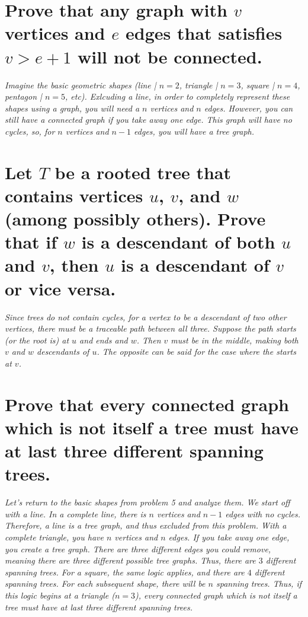 \documentclass{article}
\begin{document}

\section{Prove that any graph with $v$ vertices and $e$ edges that satisfies $v>e+1$ will not be connected.}
\hspace{1cm}\textit{Imagine the basic geometric shapes (line | $n=2$, triangle | $n=3$, square | $n=4$, pentagon | $n=5$, etc). Exlcuding a line, in order to completely represent these shapes using a graph, you will need a $n$ vertices and $n$ edges. However, you can still have a connected graph if you take away one edge. This graph will have no cycles, so, for $n$ vertices and $n-1$ edges, you will have a tree graph.}


\section{Let $T$ be a rooted tree that contains vertices $u$, $v$, and $w$ (among possibly others). Prove that if $w$ is a descendant of both $u$ and $v$, then $u$ is a descendant of $v$ or vice versa.}
\hspace{1cm}\textit{Since trees do not contain cycles, for a vertex to be a descendant of two other vertices, there must be a traceable path between all three. Suppose the path starts (or the root is) at $u$ and ends and $w$. Then $v$ must be in the middle, making both $v$ and $w$ descendants of $u$. The opposite can be said for the case where the starts at $v$.}


\section{Prove that every connected graph which is not itself a tree must have at last three different spanning trees.}
\hspace{1cm}\textit{Let's return to the basic shapes from problem 5 and analyze them. We start off with a line. In a complete line, there is $n$ vertices and $n-1$ edges with no cycles. Therefore, a line is a tree graph, and thus excluded from this problem. With a complete triangle, you have $n$ vertices and $n$ edges. If you take away one edge, you create a tree graph. There are three different edges you could remove, meaning there are three different possible tree graphs. Thus, there are $3$ different spanning trees. For a square, the same logic applies, and there are $4$ different spanning trees. For each subsequent shape, there will be $n$ spanning trees. Thus, if this logic begins at a triangle ($n=3$), every connected graph which is not itself a tree must have at last three different spanning trees.}
\end{document}
